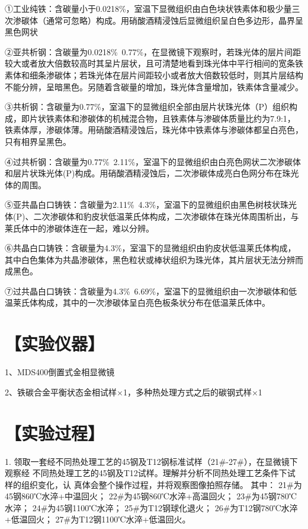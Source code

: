 \documentclass[a4paper,utf8]{article}
\begin{document}
\begin{enumerate}
    ①工业纯铁：含碳量小于0.0218\%，室温下显微组织由白色块状铁素体和极少量三次渗碳体（通常可忽略）构成。用硝酸酒精浸蚀后显微组织呈白色多边形，晶界呈黑色网状

    ②亚共析钢：含碳量为0.0218\%~0.77\%，在显微镜下观察时，若珠光体的层片间距较大或者放大倍数较高时其呈片层状，且可清楚地看到珠光体中平行相间的宽条铁素体和细条渗碳体；若珠光体在层片间距较小或者放大倍数较低时，则其片层结构不能分辨，呈暗黑色。另随着含碳量的增加，珠光体含量增加，铁素体含量减少。
    
    ③共析钢：含碳量为0.77\%，室温下的显微组织全部由层片状珠光体（P）组织构成，即片状铁素体和渗碳体的机械混合物，且铁素体与渗碳体质量比约为7.9:1，铁素体厚，渗碳体薄。用硝酸酒精浸蚀后，珠光体中铁素体与渗碳体都呈白亮色，只有相界呈黑色。
    
    ④过共析钢：含碳量为0.77\%~2.11\%，室温下的显微组织由白亮色网状二次渗碳体和层片状珠光体(P)构成。用硝酸酒精浸蚀后，二次渗碳体成亮白色网分布在珠光体的周围。
    
    ⑤亚共晶白口铸铁：含碳量为2.11\%~4.3\%，室温下的显微组织由黑色树枝状珠光体(P)、二次渗碳体和豹皮状低温莱氏体构成，二次渗碳体在珠光体周围析出，与莱氏体中的渗碳体连在一起，难以分辨。
    
    ⑥共晶白口铸铁：含碳量为4.3\%，室温下的显微组织由豹皮状低温莱氏体构成，其中白色集体为共晶渗碳体，黑色粒状或棒状组织为珠光体，其片层状无法分辨而成黑色。
    
    ⑦过共晶白口铸铁：含碳量为4.3\%~6.69\%，室温下的显微组织由一次渗碳体和低温莱氏体构成，其中的一次渗碳体呈白亮色板条状分布在低温莱氏体中。
    \end{enumerate}



\section*{【实验仪器】}%
1、MDS400倒置式金相显微镜

2、铁碳合金平衡状态金相试样×1，多种热处理方式之后的碳钢式样×1
\section*{【实验过程】}%

1. 领取一套经不同热处理工艺的45钢及T12钢标准试样（21\#-27\#），在显微镜下观察经
不同热处理工艺的45钢及T12试样。理解并分析不同热处理工艺条件下试样的组织变化，认
真体会整个操作过程，并将观察图像拍照存储。
其中：
21\#为45钢860℃水淬+中温回火；
22\#为45钢860℃水淬+高温回火；
23\#为45钢780℃水淬；
24\#为45钢1100℃水淬；
25\#为T12钢球化退火；
26\#为T12钢780℃水淬+低温回火；
27\#为T12钢1100℃水淬+低温回火。
\end{document}
